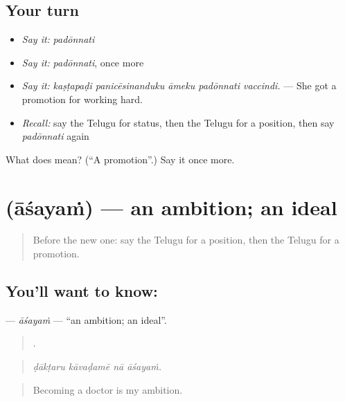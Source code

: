 \subsection*{Your turn}
\begin{itemize}
\raggedright
  \item \emph{Say it:} \emph{padōnnati}
  \item \emph{Say it:} \emph{padōnnati}, once more
  \item \emph{Say it:} \emph{kaṣṭapaḍi panicēsinanduku āmeku padōnnati vaccindi.} — She got a promotion for working hard.
  \item \emph{Recall:} say the Telugu for status, then the Telugu for a position, then say \emph{padōnnati} again
\end{itemize}

\begin{tcolorbox}[breakable,colback=teal!4,colframe=teal!35!black,title={Before you move on}]
What does  mean? (\textquotedblleft{}A promotion\textquotedblright{}.) Say it once more.
\end{tcolorbox}
\section[\texorpdfstring{\te{ఆశయం} (āśayaṁ)}{ఆశయం (āśayaṁ)}]{ (āśayaṁ) — an ambition; an ideal}

\label{lesson:TE-C522-asayam}



\begin{quote}
Before the new one: say the Telugu for a position, then the Telugu for a promotion.
\end{quote}

\subsection*{You'll want to know: }
\textbf{} — \emph{āśayaṁ} — \textquotedblleft{}an ambition; an ideal\textquotedblright{}.

\begin{quote}
   .
\end{quote}

\begin{quote}
\emph{ḍākṭaru kāvaḍamē nā āśayaṁ.}
\end{quote}

\begin{quote}
Becoming a doctor is my ambition.
\end{quote}


